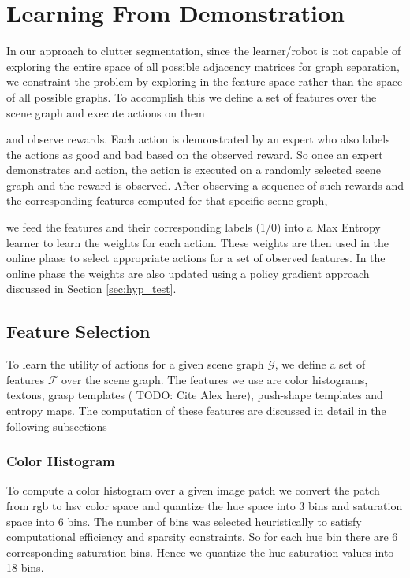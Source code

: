 \section{Learning From Demonstration}
\label{sec:obs_model}
In our approach to clutter segmentation, since the learner/robot is not capable of exploring the entire space of all possible adjacency matrices for graph separation, we constraint the problem by exploring in the feature space rather than the space of all possible graphs. To accomplish this we define a set of features over the scene graph and execute actions on them 

and observe rewards. Each action is demonstrated by an expert who also labels the actions as good and bad based on the observed reward. So once an expert demonstrates and action, the action is executed on a randomly selected scene graph and the reward is observed. After observing a sequence of such rewards and the corresponding features computed for that specific scene graph,

we feed the features and their corresponding labels (1/0) into a Max Entropy learner to learn the weights for each action. These weights are then used in the online phase to select appropriate actions for a set of observed features. In the online phase the weights are also updated using a policy gradient approach discussed in Section \ref{sec:hyp_test}.

\subsection{Feature Selection}
To learn the utility of actions for a given scene graph $\mathcal{G}$, we define a set of features $\mathcal{F}$ over the scene graph. The features we use are color histograms, textons, grasp templates (\cite{Javidi12_Journal} TODO: Cite Alex here), push-shape templates and entropy maps. The computation of these features are discussed in detail in the following subsections

\subsubsection{Color Histogram}
To compute a color histogram over a given image patch we convert the patch from rgb to hsv color space and quantize the hue space into 3 bins and saturation space into 6 bins. The number of bins was selected heuristically to satisfy computational efficiency and sparsity constraints. So for each hue bin there are 6 corresponding saturation bins. Hence we quantize the hue-saturation values into 18 bins.

